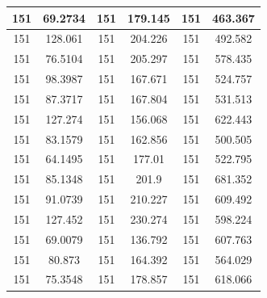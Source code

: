 \documentclass{article}
\begin{document}
\begin{tabular}{cccccc}
151&69.2734&151&179.145&151&463.367 \\ \hline
151&128.061&151&204.226&151&492.582 \\ \hline
151&76.5104&151&205.297&151&578.435 \\ \hline
151&98.3987&151&167.671&151&524.757 \\ \hline
151&87.3717&151&167.804&151&531.513 \\ \hline
151&127.274&151&156.068&151&622.443 \\ \hline
151&83.1579&151&162.856&151&500.505 \\ \hline
151&64.1495&151&177.01&151&522.795 \\ \hline
151&85.1348&151&201.9&151&681.352 \\ \hline
151&91.0739&151&210.227&151&609.492 \\ \hline
151&127.452&151&230.274&151&598.224 \\ \hline
151&69.0079&151&136.792&151&607.763 \\ \hline
151&80.873&151&164.392&151&564.029 \\ \hline
151&75.3548&151&178.857&151&618.066 \\ \hline
\end{tabular}
\end{document}
